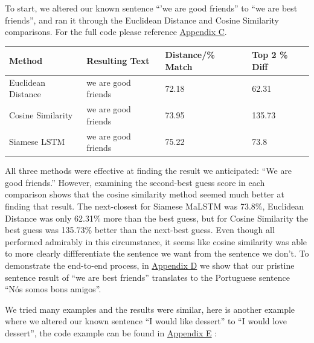 \documentclass[runningheads]{llncs}
\begin{document}
	To start, we altered our known sentence ``'we are good friends'' to ``we are best friends'', and ran it through the Euclidean Distance and Cosine Similarity comparisons. For the full code please reference \hyperlink{Appendix C}{Appendix C}.

	\begin{table} 
		\begin{center}
			\begin{tabular}{| l | l | l | l |}
			  \hline			
			  Method & Resulting Text & Distance/\% Match & Top 2 \% Diff \\
			  \hline			
			  Euclidean Distance & we are good friends & 72.18 & 62.31 \\
			  \hline			
			  Cosine Similarity & we are good friends & 73.95 & 135.73 \\
			  \hline  
			  Siamese LSTM & we are good friends & 75.22 & 73.8 \\
			  \hline
			\end{tabular}
		\end{center}
		\label{table:``We Are Best Friends'' Match Test}
	\end{table}

	All three methods were effective at finding the result we anticipated: ``We are good friends.'' However, examining the second-best guess score in each comparison shows that the cosine similarity method seemed much better at finding that result. The next-closest for Siamese MaLSTM was 73.8\%, Euclidean Distance was only 62.31\% more than the best guess, but for Cosine Similarity the best guess was 135.73\% better than the next-best guess. Even though all performed admirably in this circumstance, it seems like cosine similarity was able to more clearly diffferentiate the sentence we want from the sentence we don't.  To demonstrate the end-to-end process, in \hyperlink{Appendix D}{Appendix D} we show that our pristine sentence result of ``we are best friends'' translates to the Portuguese sentence ``Nós somos bons amigos''.

	We tried many examples and the results were similar, here is another example where we altered our known sentence ``I would like dessert'' to ``I would love dessert'', the code example can be found in \hyperlink{Appendix E}{Appendix E} :
\end{document}
